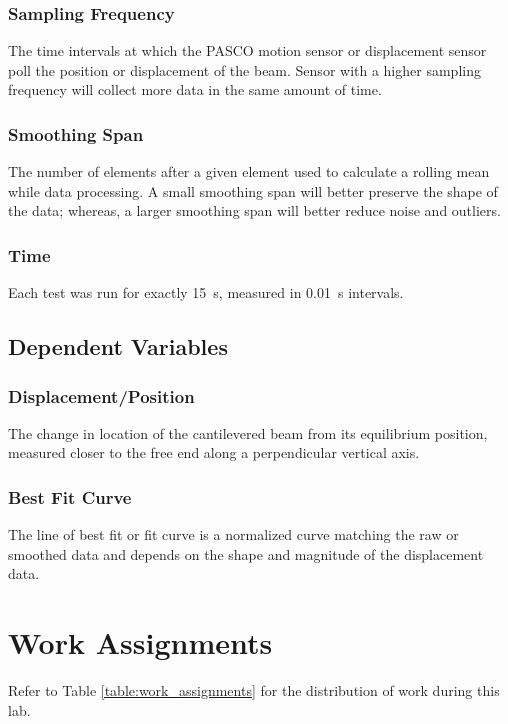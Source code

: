 \documentclass[12 pt]{report}
\begin{document}
\subsubsection{Sampling Frequency} \label{variables-independent_variables-sampling_frequency}
The time intervals at which the PASCO motion sensor or displacement sensor poll the position or displacement of the beam. Sensor with a higher sampling frequency will collect more data in the same amount of time.

\subsubsection{Smoothing Span} \label{variables-independent_variables-smoothing_span}
The number of elements after a given element used to calculate a rolling mean while data processing. A small smoothing span will better preserve the shape of the data; whereas, a larger smoothing span will better reduce noise and outliers.

\subsubsection{Time} \label{variables-independent_variables-time}
Each test was run for exactly \qty{15}{\s}, measured in \qty{0.01}{\s} intervals.

\subsection{Dependent Variables} \label{variables-dependent_variables}
\subsubsection{Displacement/Position} \label{variables-dependent_variables-displacement-position}
The change in location of the cantilevered beam from its equilibrium position, measured closer to the free end along a perpendicular vertical axis.

\subsubsection{Best Fit Curve} \label{variables-dependent_variablesbest_fit_curve}
The line of best fit or fit curve is a normalized curve matching the raw or smoothed data and depends on the shape and magnitude of the displacement data.

\section{Work Assignments} \label{work_assignments}
Refer to Table \ref{table:work_assignments} for the distribution of work during this lab.
\end{document}
